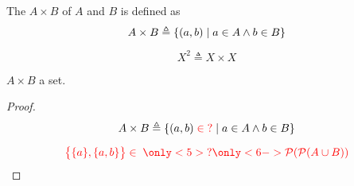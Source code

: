 
\begin{frame}{}
  \begin{definition}
    The  $A \times B$ of $A$ and $B$ is defined as 
    \[
      {A \times B \triangleq \{(a, b) \mid a \in A \land b \in B\}}
    \]
  \end{definition}

  \pause
  \[
    X^2 \triangleq X \times X
  \]

  \pause
  \begin{theorem}
    $A \times B$  a set.
  \end{theorem}

  \pause
  \begin{proof}
    \[
      A \times B \triangleq \{(a, b) \;\textcolor{red}{\in\; ?} \mid a \in A \land b \in B\}
    \]

    \pause
    \[
      \red{\bset{\set{a}, \set{a, b}} \in\; \only<5>{?}\only<6->{\ps{\ps{A \cup B}}}}
    \]
  \end{proof}

\end{frame}
